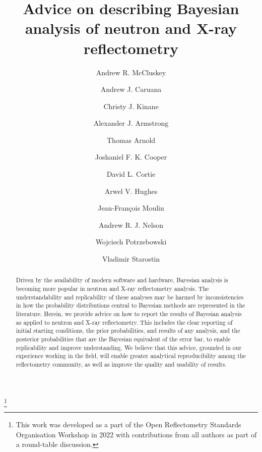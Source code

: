 \documentclass[reprint,superscriptaddress,aps,amsmath]{revtex4-2}
\begin{document}
\title{Advice on describing Bayesian analysis of neutron and X-ray reflectometry}
\thanks{This work was developed as a part of the Open Reflectometry Standards Organisation Workshop in 2022 with contributions from all authors as part of a round-table discussion.}

\author{Andrew R. McCluskey}
\author{Andrew J. Caruana}
\author{Christy J. Kinane}
\author{Alexander J. Armstrong}
\author{Thomas Arnold}
\author{Joshaniel F. K. Cooper}
\author{David L. Cortie}
\author{Arwel V. Hughes}
\author{Jean-Fran\c{c}ois Moulin}
\author{Andrew R. J. Nelson}
\author{Wojciech Potrzebowski}
\author{Vladimir Starostin}
  

\begin{abstract}
  Driven by the availability of modern software and hardware, Bayesian analysis is becoming more popular in neutron and X-ray reflectometry analysis.
  The understandability and replicability of these analyses may be harmed by inconsistencies in how the probability distributions central to Bayesian methods are represented in the literature. 
  Herein, we provide advice on how to report the results of Bayesian analysis as applied to neutron and X-ray reflectometry. 
  This includes the clear reporting of initial starting conditions, the prior probabilities, and results of any analysis, and the posterior probabilities that are the Bayesian equivalent of the error bar, to enable replicability and improve understanding. 
  We believe that this advice, grounded in our experience working in the field, will enable greater analytical reproducibility among the reflectometry community, as well as improve the quality and usability of results. 
\end{abstract}
\end{document}

